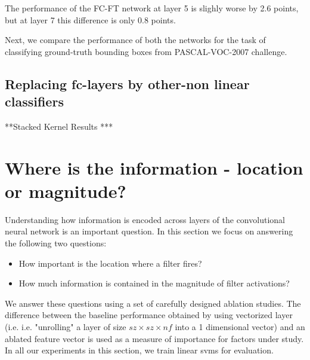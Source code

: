 \documentclass[runningheads]{llncs}
\begin{document}
The performance of the FC-FT network at layer 5 is slighly worse by 2.6 points, but at layer 7 this difference is only 0.8 points. 

Next, we compare the performance of both the networks for the task of classifying ground-truth bounding boxes from PASCAL-VOC-2007 challenge.  

\subsection{Replacing fc-layers by other-non linear classifiers}
**Stacked Kernel Results ***



\section{Where is the information - location or magnitude?}
Understanding how information is encoded across layers of the convolutional neural network is an important question. In this section we focus on answering the following two questions:
\begin{itemize}
\item How important is the location where a filter fires?
\item How much information is contained in the magnitude of filter activations?
\end{itemize}

We answer these questions using a set of carefully designed ablation studies. The difference between the baseline performance obtained by using vectorized  layer (i.e. i.e. "unrolling" a layer of size $sz \times sz \times nf$ into a 1 dimensional vector) and an ablated feature vector is used as a measure of importance for factors under study. In all our experiments in this section, we train linear svms for evaluation.
\end{document}
